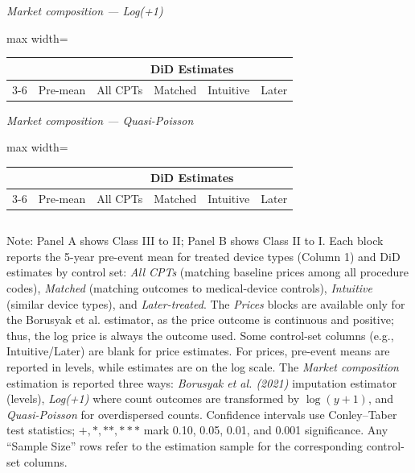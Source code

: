 \documentclass[letterpaper,12pt]{article}
\theoremstyle{definition}
\begin{document}
\begin{table}[t]
\begin{threeparttable}
\begin{minipage}[t]{0.49\textwidth}
\emph{Market composition --- Log(+1)}\par
\begin{adjustbox}{max width=\linewidth}
\begin{tabular}{@{}lccccc@{}}
\toprule
 &  & \multicolumn{4}{c}{DiD Estimates} \\
\cmidrule(lr){3-6}
 & Pre-mean & All CPTs & Matched & Intuitive & Later \\
\midrule

\bottomrule
\end{tabular}
\end{adjustbox}\vspace{6pt}

\emph{Market composition --- Quasi-Poisson}\par
\begin{adjustbox}{max width=\linewidth}
\begin{tabular}{@{}lccccc@{}}
\toprule
 &  & \multicolumn{4}{c}{DiD Estimates} \\
\cmidrule(lr){3-6}
 & Pre-mean & All CPTs & Matched & Intuitive & Later \\
\midrule

\bottomrule
\end{tabular}
\end{adjustbox}
\end{minipage}
\begin{tabular*}{\textwidth}{@{}l@{}}
\end{tabular*}

\begin{tablenotes}\footnotesize
\item[] Note: Panel A shows Class III to II; Panel B shows Class II to I. Each block reports the 5-year pre-event mean for treated device types (Column 1) and DiD estimates by control set: \emph{All CPTs} (matching baseline prices among all procedure codes), \emph{Matched} (matching outcomes to medical-device controls), \emph{Intuitive} (similar device types), and \emph{Later-treated}. 
The \emph{Prices} blocks are available only for the Borusyak et al. estimator, as the price outcome is continuous and positive; thus, the log price is always the outcome used. Some control-set columns (e.g., Intuitive/Later) are blank for price estimates. For prices, pre-event means are reported in levels, while estimates are on the log scale. The \emph{Market composition} estimation is reported three ways: \emph{Borusyak et al. (2021)} imputation estimator (levels), \emph{Log(+1)} where count outcomes are transformed by $\log(y+1)$, and \emph{Quasi-Poisson} for overdispersed counts.  Confidence intervals use Conley–Taber test statistics; $+,*,**,***$ mark 0.10, 0.05, 0.01, and 0.001 significance. Any ``Sample Size'' rows refer to the estimation sample for the corresponding control-set columns.
\end{tablenotes}
\end{threeparttable}
\label{tab:Robustness_MarketStructure}
\end{table}
\end{document}
